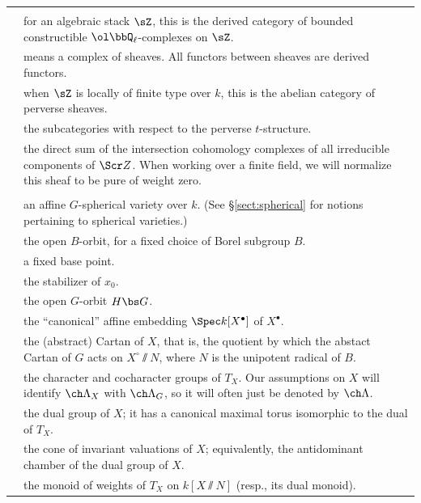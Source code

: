 \documentclass[final]{amsart}
\theoremstyle{remark}
\theoremstyle{definition}
\numberwithin{equation}{section}
\begin{document}
\begin{longtable}{>{\raggedleft}p{} p{} }
\\
& \\
{$\rmD^b_c(\sZ)$} & {for an algebraic stack $\sZ$, this is the derived category of 
bounded constructible $\ol\bbQ_\ell$-complexes on $\sZ$.} \\
{`sheaf'} & {means a complex of sheaves. 
All functors between sheaves are derived functors.} \\
{$\rmP(\sZ) \subset \rmD^b_c(\sZ)$} & {when $\sZ$ is locally of finite type over $k$, this is the abelian category of perverse sheaves.}\\
{$^p\rmD^{\le 0}, {^p}\rmD^{\ge 0}$} & 
the subcategories with respect
to the perverse $t$-structure. \\
{$\IC_{\Scr Z}$} & {the direct sum of the intersection cohomology complexes
of all irreducible components of $\Scr Z$. When working over a finite field, we will normalize this sheaf to be pure of weight zero.} 
\\
&\\
{$X$} & {an affine $G$-spherical variety over $k$. (See \S \ref{sect:spherical} for notions pertaining to spherical varieties.)} \\
{$X^\circ$} & {the open $B$-orbit, for a fixed choice of Borel subgroup $B$.} \\
{$x_0 \in X^\circ(k)$} & {a fixed base point.} \\
{$H$} & {the stabilizer of $x_0$.} \\
{$X^\bullet$} & {the open $G$-orbit $H\bs G $.} \\
{$X^\can$} & {the ``canonical'' affine embedding $\Spec k[X^\bullet]$ of $X^\bullet$.} \\
{$T_X$} & {the (abstract) Cartan of $X$, that is, the quotient by which the abstact Cartan of $G$ acts on $X^\circ\sslash N$, where $N$ is the unipotent radical of $B$.} \\
{$\Lambda_X, \ch \Lambda_X$} & {the character and cocharacter groups of $T_X$. Our assumptions on $X$ will identify $\ch\Lambda_X$ with $\ch\Lambda_G$, so it will often just be denoted by $\ch\Lambda$.} \\
{$\check G_X$} & {the dual group of $X$; it has a canonical maximal torus isomorphic to the dual of $T_X$.} \\
{$\Cal V$} & {the cone of invariant valuations of $X$; equivalently, the antidominant chamber of the dual group of $X$.} \\
{$\mathfrak c_X^\vee \subset \Lambda_X$ ($\mathfrak c_X\subset \ch\Lambda_X$)} & 
{the monoid of weights of $T_X$ on $k[X\sslash N]$ (resp., its dual monoid).} \\

\end{longtable}
\end{document}
